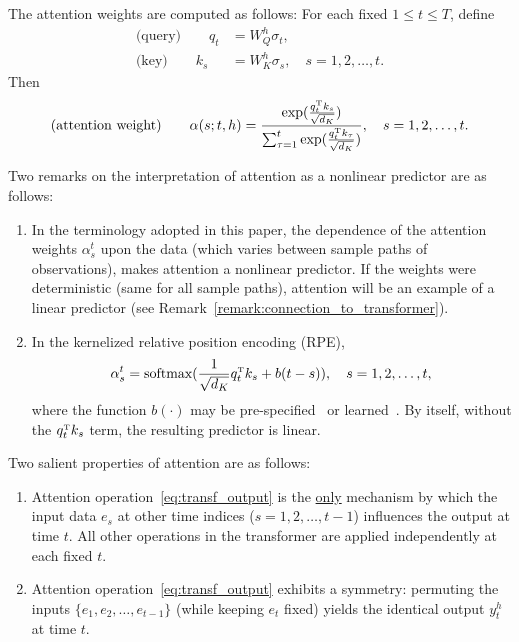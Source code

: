 \documentclass[twoside,11pt]{article}
\def\transpose{{\hbox{\rm\tiny T}}}
\begin{document}
  The attention weights are computed as follows:  For each fixed $1\leq t\leq T$, 
  define \begin{align*}
  \text{(query)} \qquad q_t &= W_Q^h \sigma_t, \\
           \text{(key)} \qquad k_s &= W_K^h \sigma_s,\quad s=1,2,\hdots, t.
\end{align*}
Then
\begin{equation*}
\text{(attention weight)} \qquad \alpha(s;t,h) = \frac{\exp({\frac{q_t^\transpose k_s}{\sqrt{d_K}}})}{\sum_{\tau=1}^t \exp({\frac{q_t^\transpose k_\tau}{\sqrt{d_K}}})},\quad s=1,2,\hdots, t.
\end{equation*}

\begin{remark}\label{rem:RPE}
Two remarks on the interpretation of attention as a nonlinear predictor
are as follows:
  \begin{enumerate}
 \item In the terminology adopted in this paper, the dependence of the
attention weights $\alpha_s^t$ upon the data (which varies between sample paths of
observations), makes attention a nonlinear predictor.  If the weights
were deterministic (same for all sample paths), attention will be an
example of a linear predictor (see Remark~\ref{remark:connection_to_transformer}).
\item 
  In the kernelized relative position encoding (RPE),
  \begin{equation*}
  \alpha_s^t = \text{softmax}(\frac{1}{\sqrt{d_K}}q_t^\transpose k_s +
  b(t-s)),\quad s=1,2,\hdots,t,
  \end{equation*}
    where the function $b(\cdot)$ may be pre-specified~\citep{press2021train} or learned~\citep{chi2022kerple}. 
    By itself, without the $q_t^\transpose k_s$ term, the resulting predictor is linear.
  \end{enumerate}
  \end{remark}

  \begin{remark}\label{rem:symmetry} Two salient properties of 
    attention are as follows:
    \begin{enumerate}
    \item Attention operation~\eqref{eq:transf_output} is the \underline{only} mechanism by
    which the input data $e_s$ at other time indices
    ($s=1,2,\hdots,t-1$) influences the output at time $t$.   
All other operations in the transformer are applied independently at
each fixed $t$.
\item 
      Attention operation~\eqref{eq:transf_output} exhibits a symmetry:  
  permuting the inputs $\{e_1,e_2,\hdots,e_{t-1}\}$ (while keeping $e_t$ fixed)  
  yields the identical output $y_t^h$ at time $t$.  
  \end{enumerate}
\end{remark}
\end{document}
